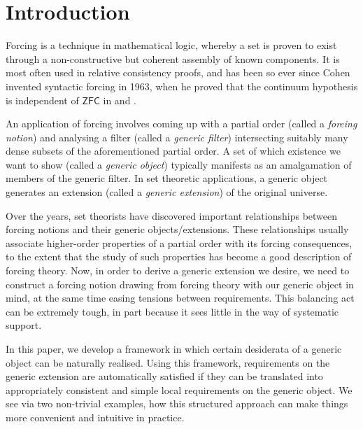 \documentclass[12pt]{article}
\numberwithin{equation}{section}
\begin{document}
\newcommand{\blankpage}{
\newpage
\thispagestyle{empty}
\mbox{}
\newpage
}

{\let\clearpage\relax \tableofcontents} 

\section{Introduction}\label{sect1}

Forcing is a technique in mathematical logic, whereby a set is proven to exist through a non-constructive but coherent assembly of known components. It is most often used in relative consistency proofs, and has been so ever since Cohen invented syntactic forcing in 1963, when he proved that the continuum hypothesis is independent of $\mathsf{ZFC}$ in \cite{cohen1} and \cite{cohen2}.

An application of forcing involves coming up with a partial order (called a \emph{forcing notion}) and analysing a filter (called a \emph{generic filter}) intersecting suitably many dense subsets of the aforementioned partial order. A set of which existence we want to show (called a \emph{generic object}) typically manifests as an amalgamation of members of the generic filter. In set theoretic applications, a generic object generates an extension (called a \emph{generic extension}) of the original universe. 

Over the years, set theorists have discovered important relationships between forcing notions and their generic objects\slash extensions. These relationships usually associate higher-order properties of a partial order with its forcing consequences, to the extent that the study of such properties has become a good description of forcing theory. Now, in order to derive a generic extension we desire, we need to construct a forcing notion drawing from forcing theory with our generic object in mind, at the same time easing tensions between requirements. This balancing act can be extremely tough, in part because it sees little in the way of systematic support.

In this paper, we develop a framework in which certain desiderata of a generic object can be naturally realised. Using this framework, requirements on the generic extension are automatically satisfied if they can be translated into appropriately consistent and simple local requirements on the generic object. We see via two non-trivial examples, how this structured approach can make things more convenient and intuitive in practice.
\end{document}
